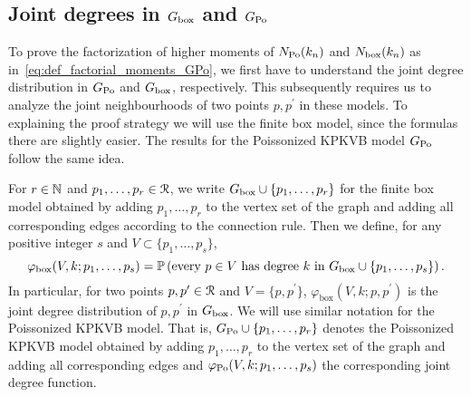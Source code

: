 \subsection{Joint degrees in \texorpdfstring{$G_{\mathrm{box}}$}{G box} and \texorpdfstring{$G_{{\mathrm{Po}}}$}{G Po}}\label{ssec:joint_degrees_GPo}

To prove the factorization of higher moments of $N_{{\mathrm{Po}}}(k_n)$ and $N_{\text{box}}(k_n)$ as in~\eqref{eq:def_factorial_moments_GPo}, we first have to understand the joint degree distribution in $G_{{\mathrm{Po}}}$ and $G_{\mathrm{box}}$, respectively. This subsequently requires us to analyze the joint neighbourhoods of two points $p, p^\prime$ in these models. To explaining the proof strategy we will use the finite box model, since the formulas there are slightly easier. The results for the Poissonized KPKVB model $G_{{\mathrm{Po}}}$ follow the same idea.

%
%

For $r\in \mathbb{N}$ and $p_1, \dots, p_r \in {\mathcal R}$, we write $G_{\mathrm{box}}\cup \{p_1,\dots,p_r\}$ for the finite box model obtained by adding $p_1,\dots,p_r$ to the vertex set of the graph and adding all corresponding edges according to the connection rule. Then we define, for any positive integer $s$ and $V \subset \{p_1,\dots,p_s\}$,
\begin{equation}\label{eq:def_joint_degree_distribution}
\varphi_{\mathrm{box}}(V, k ; p_1,\dots,p_s) = \mathbb{P}\left(\text{every }p\in V\text{ has degree }k\text{ in }G_{\mathrm{box}} \cup \{p_1,\dots,p_s\}\right).
\end{equation}
In particular, for two points $p, p^\prime \in {\mathcal R}$ and $V = \{p,p^\prime\}$, $\varphi_{\mathrm{box}}(V, k ;p,p^\prime)$ is the joint degree distribution of $p, p^\prime $ in $G_{\mathrm{box}}$. We will use similar notation for the Poissonized KPKVB model. That is, $G_{{\mathrm{Po}}} \cup \{p_1,\dots,p_r\}$ denotes the Poissonized KPKVB model obtained by adding $p_1,\dots,p_r$ to the vertex set of the graph and adding all corresponding edges and $\varphi_{{\mathrm{Po}}}(V, k ; p_1,\dots,p_s)$ the corresponding joint degree function.

